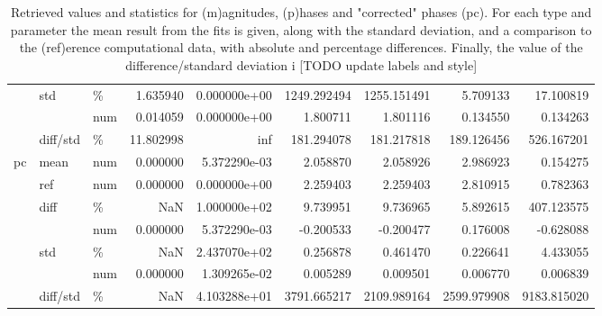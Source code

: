 \begin{table}
\begin{tabular}{lllrrrrrr}
   & std & \% &           1.635940 &       0.000000e+00 &        1249.292494 &        1255.151491 &          5.709133 &         17.100819 \\
   &          & num &           0.014059 &       0.000000e+00 &           1.800711 &           1.801116 &          0.134550 &          0.134263 \\
   & diff/std & \% &          11.802998 &                inf &         181.294078 &         181.217818 &        189.126456 &        526.167201 \\
pc & mean & num &           0.000000 &       5.372290e-03 &           2.058870 &           2.058926 &          2.986923 &          0.154275 \\
   & ref & num &           0.000000 &       0.000000e+00 &           2.259403 &           2.259403 &          2.810915 &          0.782363 \\
   & diff & \% &                NaN &       1.000000e+02 &           9.739951 &           9.736965 &          5.892615 &        407.123575 \\
   &          & num &           0.000000 &       5.372290e-03 &          -0.200533 &          -0.200477 &          0.176008 &         -0.628088 \\
   & std & \% &                NaN &       2.437070e+02 &           0.256878 &           0.461470 &          0.226641 &          4.433055 \\
   &          & num &           0.000000 &       1.309265e-02 &           0.005289 &           0.009501 &          0.006770 &          0.006839 \\
   & diff/std & \% &                NaN &       4.103288e+01 &        3791.665217 &        2109.989164 &       2599.979908 &       9183.815020 \\
\bottomrule
\end{tabular}

\caption{\label{tab:matE}Retrieved values and statistics for (m)agnitudes, (p)hases and "corrected" phases (pc). For each type and parameter the mean result from the fits is given, along with the standard deviation, and a comparison to the (ref)erence computational data, with absolute and percentage differences. Finally, the value of the difference/standard deviation i [TODO update labels and style]}
\end{table}